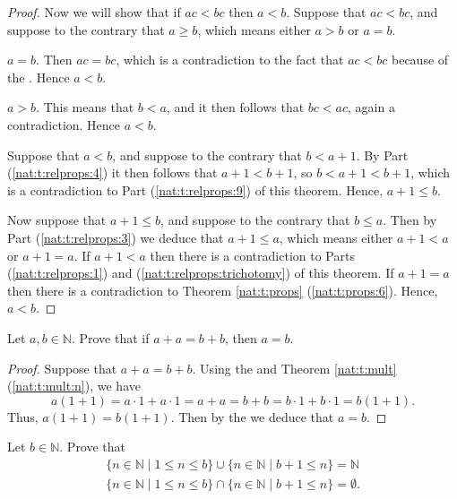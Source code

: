 \begin{proof}
	Now we will show that if $a c < b c$ then $a < b$. Suppose that $a c < b c$, and suppose to the contrary that $a \geq b$, which means either $a > b$ or $a = b$.
	\begin{bycases}
		\item $a = b$. Then $a c = b c$, which is a contradiction to the fact that $a c < b c$ because of the . Hence $a < b$.
		\item $a > b$. This means that $b < a$, and it then follows that $b c < a c$, again a contradiction. Hence $a < b$.
	\end{bycases}

	Suppose that $a < b$, and suppose to the contrary that $b < a + 1$. By Part (\ref{nat:t:relprops:4}) it then follows that $a + 1 < b + 1$, so $b < a + 1 < b + 1$, which is a contradiction to Part (\ref{nat:t:relprops:9}) of this theorem. Hence, $a + 1 \leq b$.

	Now suppose that $a + 1 \leq b$, and suppose to the contrary that $b \leq a$. Then by Part (\ref{nat:t:relprops:3}) we deduce that $a + 1 \leq a$, which means either $a + 1 < a$ or $a + 1 = a$. If $a + 1 < a$ then there is a contradiction to Parts (\ref{nat:t:relprops:1}) and (\ref{nat:t:relprops:trichotomy}) of this theorem. If $a + 1 = a$ then there is a contradiction to Theorem \ref{nat:t:props} (\ref{nat:t:props:6}). Hence, $a < b$.
\end{proof}


\Newpage
\begin{exercise} %
	\label{nat:e:5}
	Let $a, b \in \mathbb{N}$. Prove that if $a + a = b + b$, then $a = b$.
\end{exercise}

\begin{proof}
	Suppose that $a + a = b + b$. Using the  and Theorem \ref{nat:t:mult} (\ref{nat:t:mult:n}), we have
	$$
		a(1 + 1) = a \cdot 1 + a \cdot 1 = a + a = b + b = b \cdot 1 + b \cdot 1 = b(1 + 1).
	$$
	Thus, $a(1 + 1) = b(1 + 1)$. Then by the  we deduce that $a = b$.
\end{proof}


\Newpage
\begin{exercise} %
	Let $b \in \mathbb{N}$. Prove that
	\begin{align*}
		\{n \in \mathbb{N} \mid 1 \leq n \leq b\} \cup\{n \in \mathbb{N} \mid b+1 \leq n\} = \mathbb{N} \\
		\{n \in \mathbb{N} \mid 1 \leq n \leq b\} \cap\{n \in \mathbb{N} \mid b+1 \leq n\} = \emptyset.
	\end{align*}
\end{exercise}

